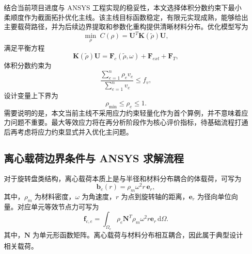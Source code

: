 \documentclass{FRB-style}
\let\oldcite\cite
\renewcommand{\cite}[1]{\textsuperscript{\oldcite{#1}}}
\begin{document}
结合当前项目进度与 ANSYS 工程实现的稳妥性，本文选择体积分数约束下最小柔顺度作为截面拓扑优化主线。该主线目标函数稳定，有限元实现成熟，能够给出主要载荷路径，并为后续边界提取和参数化重构提供清晰材料分布。优化模型写为
\begin{equation}
\min_{\rho}\; C(\rho)=\mathbf{U}^{T}\mathbf{K}(\tilde{\rho})\mathbf{U},
\end{equation}
满足平衡方程
\begin{equation}
\mathbf{K}(\tilde{\rho})\mathbf{U}=\mathbf{F}_c(\tilde{\rho},\omega)+\mathbf{F}_{ext}+\mathbf{F}_{T},
\end{equation}
体积分数约束为
\begin{equation}
\frac{\sum_{e=1}^{n}\rho_e v_e}{\sum_{e=1}^{n}v_e}\leq f_v,
\end{equation}
设计变量上下界为
\begin{equation}
\rho_{\min}\leq\rho_e\leq1.
\end{equation}
需要说明的是，本文当前主线不采用应力约束轻量化作为首个算例，并不意味着应力问题不重要。最大等效应力将在再分析阶段作为核心评价指标，待基础流程打通后再考虑将应力约束显式并入优化主问题。

\subsection{离心载荷边界条件与 ANSYS 求解流程}

对于旋转盘类结构，离心载荷本质上是与半径和材料分布耦合的体载荷，可写为
\begin{equation}
\mathbf{b}_c(r)=\rho_m\omega^2 r\,\mathbf{e}_r,
\end{equation}
其中，$\rho_m$ 为材料密度，$\omega$ 为角速度，$r$ 为点到旋转轴的距离，$\mathbf{e}_r$ 为径向单位向量。对应单元等效节点力可写为
\begin{equation}
\mathbf{f}_{c,e}=\int_{\Omega_e}\rho_e\mathbf{N}^{T}\rho_m\omega^2 r\mathbf{e}_r\,\mathrm{d}\Omega.
\end{equation}
其中，$\mathbf{N}$ 为单元形函数矩阵。离心载荷与材料分布相互耦合，因此属于典型设计相关载荷\cite{Chen2001,Bourdin2003,Han2021}。
\end{document}
